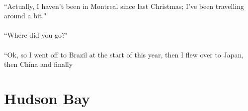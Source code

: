 \documentclass{article}
\begin{document}
\paragraph{}
``Actually, I haven't been in Montreal since last Christmas; I've been travelling around a bit."

\paragraph{}
``Where did you go?"

\paragraph{}
``Ok, so I went off to Brazil at the start of this year, then I flew over to Japan, then China and finally 

\section{Hudson Bay}
\end{document}
